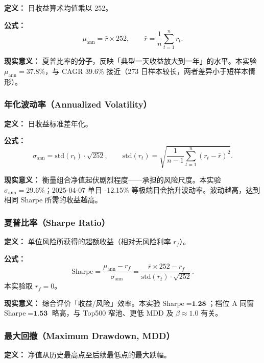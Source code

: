 \documentclass[UTF8,a4paper,12pt]{ctexart}
\begin{document}
\textbf{定义：} 日收益算术均值乘以 252。

\textbf{公式：}
\begin{equation}
  \mu_{\mathrm{ann}} = \bar{r}\times 252,
  \qquad \bar{r}=\frac{1}{n}\sum_{t=1}^{n}r_t.
\end{equation}

\textbf{现实意义：} 夏普比率的\textbf{分子}，反映「典型一天收益放大到一年」的水平。本实验 $\mu_{\mathrm{ann}}=37.8\%$，与 CAGR 39.6\% 接近（273 日样本较长，两者差异小于短样本情形）。

\subsubsection{年化波动率（Annualized Volatility）}

\textbf{定义：} 日收益标准差年化。

\textbf{公式：}
\begin{equation}
  \sigma_{\mathrm{ann}} = \mathrm{std}(r_t)\cdot\sqrt{252},
  \qquad \mathrm{std}(r_t)=\sqrt{\frac{1}{n-1}\sum_{t=1}^{n}(r_t-\bar{r})^2}.
\end{equation}

\textbf{现实意义：} 衡量组合净值起伏剧烈程度——承担的风险尺度。本实验 $\sigma_{\mathrm{ann}}=29.6\%$；2025-04-07 单日 -12.15\% 等极端日会抬升波动率。波动越高，达到相同 Sharpe 所需的收益越高。

\subsubsection{夏普比率（Sharpe Ratio）}

\textbf{定义：} 单位风险所获得的超额收益（相对无风险利率 $r_f$）。

\textbf{公式：}
\begin{equation}
  \mathrm{Sharpe} = \frac{\mu_{\mathrm{ann}} - r_f}{\sigma_{\mathrm{ann}}}
  = \frac{\bar{r}\times 252 - r_f}{\mathrm{std}(r_t)\cdot\sqrt{252}}.
\end{equation}
本实验取 $r_f=0$。

\textbf{现实意义：} 综合评价「收益/风险」效率。本实验 Sharpe$=\textbf{1.28}$；档位 A 同窗 Sharpe$=\textbf{1.53}$ 略高，与 Top500 窄池、更低 MDD 及 $\beta\approx 1.0$ 有关。

\subsubsection{最大回撤（Maximum Drawdown, MDD）}

\textbf{定义：} 净值从历史最高点至后续最低点的最大跌幅。
\end{document}

